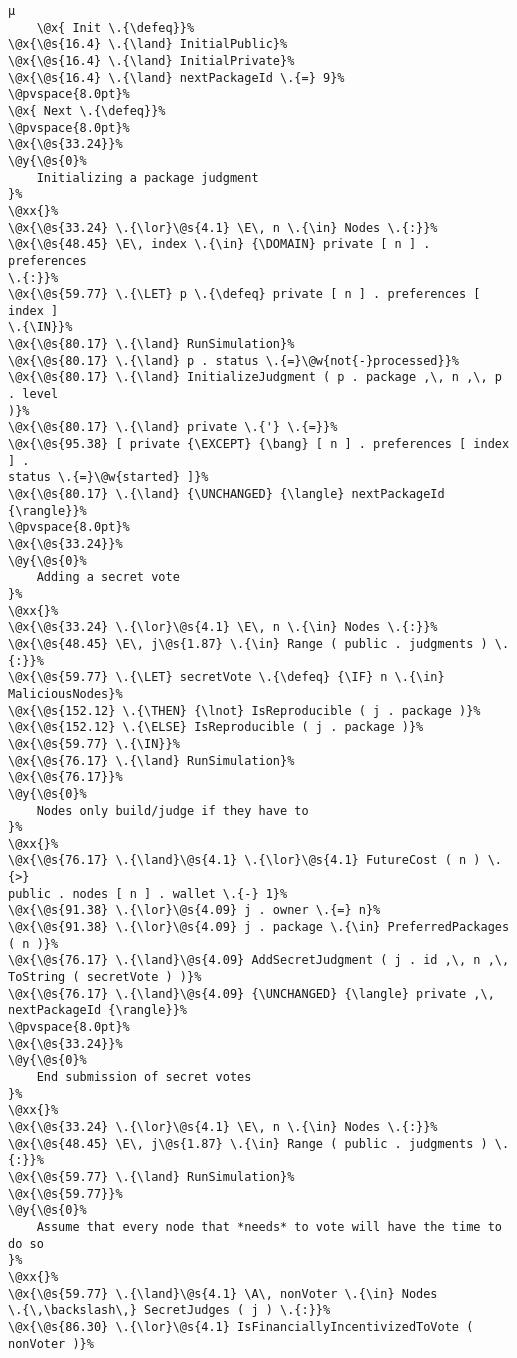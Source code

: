 \begin{lstlisting}[caption=System actor behaviour in TLA\textsuperscript+ specification]
    µ
    \@x{ Init \.{\defeq}}%
\@x{\@s{16.4} \.{\land} InitialPublic}%
\@x{\@s{16.4} \.{\land} InitialPrivate}%
\@x{\@s{16.4} \.{\land} nextPackageId \.{=} 9}%
\@pvspace{8.0pt}%
\@x{ Next \.{\defeq}}%
\@pvspace{8.0pt}%
\@x{\@s{33.24}}%
\@y{\@s{0}%
    Initializing a package judgment
}%
\@xx{}%
\@x{\@s{33.24} \.{\lor}\@s{4.1} \E\, n \.{\in} Nodes \.{:}}%
\@x{\@s{48.45} \E\, index \.{\in} {\DOMAIN} private [ n ] . preferences
\.{:}}%
\@x{\@s{59.77} \.{\LET} p \.{\defeq} private [ n ] . preferences [ index ]
\.{\IN}}%
\@x{\@s{80.17} \.{\land} RunSimulation}%
\@x{\@s{80.17} \.{\land} p . status \.{=}\@w{not{-}processed}}%
\@x{\@s{80.17} \.{\land} InitializeJudgment ( p . package ,\, n ,\, p . level
)}%
\@x{\@s{80.17} \.{\land} private \.{'} \.{=}}%
\@x{\@s{95.38} [ private {\EXCEPT} {\bang} [ n ] . preferences [ index ] .
status \.{=}\@w{started} ]}%
\@x{\@s{80.17} \.{\land} {\UNCHANGED} {\langle} nextPackageId {\rangle}}%
\@pvspace{8.0pt}%
\@x{\@s{33.24}}%
\@y{\@s{0}%
    Adding a secret vote
}%
\@xx{}%
\@x{\@s{33.24} \.{\lor}\@s{4.1} \E\, n \.{\in} Nodes \.{:}}%
\@x{\@s{48.45} \E\, j\@s{1.87} \.{\in} Range ( public . judgments ) \.{:}}%
\@x{\@s{59.77} \.{\LET} secretVote \.{\defeq} {\IF} n \.{\in} MaliciousNodes}%
\@x{\@s{152.12} \.{\THEN} {\lnot} IsReproducible ( j . package )}%
\@x{\@s{152.12} \.{\ELSE} IsReproducible ( j . package )}%
\@x{\@s{59.77} \.{\IN}}%
\@x{\@s{76.17} \.{\land} RunSimulation}%
\@x{\@s{76.17}}%
\@y{\@s{0}%
    Nodes only build/judge if they have to
}%
\@xx{}%
\@x{\@s{76.17} \.{\land}\@s{4.1} \.{\lor}\@s{4.1} FutureCost ( n ) \.{>}
public . nodes [ n ] . wallet \.{-} 1}%
\@x{\@s{91.38} \.{\lor}\@s{4.09} j . owner \.{=} n}%
\@x{\@s{91.38} \.{\lor}\@s{4.09} j . package \.{\in} PreferredPackages ( n )}%
\@x{\@s{76.17} \.{\land}\@s{4.09} AddSecretJudgment ( j . id ,\, n ,\,
ToString ( secretVote ) )}%
\@x{\@s{76.17} \.{\land}\@s{4.09} {\UNCHANGED} {\langle} private ,\,
nextPackageId {\rangle}}%
\@pvspace{8.0pt}%
\@x{\@s{33.24}}%
\@y{\@s{0}%
    End submission of secret votes
}%
\@xx{}%
\@x{\@s{33.24} \.{\lor}\@s{4.1} \E\, n \.{\in} Nodes \.{:}}%
\@x{\@s{48.45} \E\, j\@s{1.87} \.{\in} Range ( public . judgments ) \.{:}}%
\@x{\@s{59.77} \.{\land} RunSimulation}%
\@x{\@s{59.77}}%
\@y{\@s{0}%
    Assume that every node that *needs* to vote will have the time to do so
}%
\@xx{}%
\@x{\@s{59.77} \.{\land}\@s{4.1} \A\, nonVoter \.{\in} Nodes
\.{\,\backslash\,} SecretJudges ( j ) \.{:}}%
\@x{\@s{86.30} \.{\lor}\@s{4.1} IsFinanciallyIncentivizedToVote ( nonVoter )}%

\end{lstlisting}
